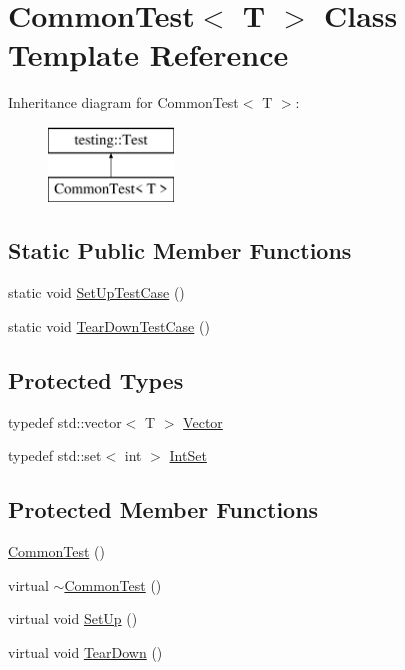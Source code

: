 \hypertarget{class_common_test}{}\section{Common\+Test$<$ T $>$ Class Template Reference}
\label{class_common_test}
Inheritance diagram for Common\+Test$<$ T $>$\+:\begin{figure}[H]
\begin{center}
\leavevmode
\includegraphics[height=2.000000cm]{class_common_test}
\end{center}
\end{figure}
\subsection*{Static Public Member Functions}
\begin{DoxyCompactItemize}
\item 
static void \hyperlink{class_common_test_a6edd90f32f45cc49e4a423b22bd770ce}{Set\+Up\+Test\+Case} ()
\item 
static void \hyperlink{class_common_test_a68d2bf5108cf28478331588fbdff4838}{Tear\+Down\+Test\+Case} ()
\end{DoxyCompactItemize}
\subsection*{Protected Types}
\begin{DoxyCompactItemize}
\item 
typedef std\+::vector$<$ T $>$ \hyperlink{class_common_test_a6dfdcede6964887b9f4254a0e0478e37}{Vector}
\item 
typedef std\+::set$<$ int $>$ \hyperlink{class_common_test_a62827e9d3064cddf4a8698747f1bd434}{Int\+Set}
\end{DoxyCompactItemize}
\subsection*{Protected Member Functions}
\begin{DoxyCompactItemize}
\item 
\hyperlink{class_common_test_abd5ec205d90f4b81efab2a6f972f3db0}{Common\+Test} ()
\item 
virtual \hyperlink{class_common_test_a675a632fcf7b1fd961fefc619d6a458d}{$\sim$\+Common\+Test} ()
\item 
virtual void \hyperlink{class_common_test_a4c7bf7889ce48a9d06530bc4a437f3f5}{Set\+Up} ()
\item 
virtual void \hyperlink{class_common_test_aeae195c2cefa956c6ae5be1226e6ecd8}{Tear\+Down} ()
\end{DoxyCompactItemize}

